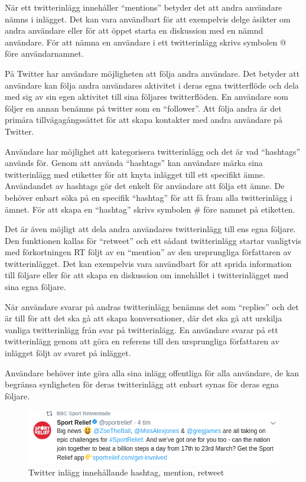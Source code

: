 \documentclass{kaumasters} %
\begin{document}
När ett twitterinlägg innehåller “mentions” betyder det att andra användare nämns i inlägget. Det kan vara användbart för att exempelvis delge åsikter om andra användare eller för att öppet starta en diskussion med en nämnd användare. För att nämna en användare i ett twitterinlägg skrivs symbolen @ före användarnamnet. 

På Twitter har användare möjligheten att följa andra användare. Det betyder att användare kan följa andra användares aktivitet i deras egna twitterflöde och dela med sig av sin egen aktivitet till sina följares twitterflöden. En användare som följer en annan benämns på twitter som en “follower”. Att följa andra är det primära tillvägagångssättet för att skapa kontakter med andra användare på Twitter.  

Användare har möjlighet att kategorisera twitterinlägg och det är vad “hashtags” används för. Genom att använda “hashtags” kan användare märka sina twitterinlägg med etiketter för att knyta inlägget till ett specifikt ämne. Användandet av hashtags gör det enkelt för användare att följa ett ämne. De behöver enbart söka på en specifik “hashtag” för att få fram alla twitterinlägg i ämnet. För att skapa en “hashtag” skrivs symbolen \# före namnet på etiketten.

Det är även möjligt att dela andra användares twitterinlägg till ens egna följare. Den funktionen kallas för “retweet” och ett sådant twitterinlägg startar vanligtvis med förkortningen RT följt av en “mention” av den ursprungliga författaren av twitterinlägget. Det kan exempelvis vara användbart för att sprida information till följare eller för att skapa en diskussion om innehållet i twitterinlägget med sina egna följare. 

När användare svarar på andras twitterinlägg benämns det som “replies” och det är till för att det ska gå att skapa konversationer, där det ska gå att urskilja vanliga twitterinlägg från svar på twitterinlägg. En användare svarar på ett twitterinlägg genom att göra en referens till den ursprungliga författaren av inlägget följt av svaret på inlägget.

Användare behöver inte göra alla sina inlägg offentliga för alla användare, de kan begränsa synligheten för deras twitterinlägg att enbart synas för deras egna följare\cite{TSAsurvey}.

\begin{figure}[h]
\includegraphics[width=12cm]{tweet}
\centering
\caption{Twitter inlägg innehållande hashtag, mention, retweet}

\end{figure}
\end{document}
